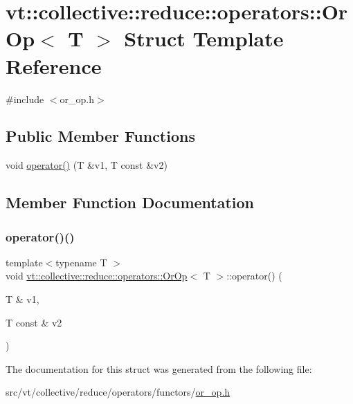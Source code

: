 \hypertarget{structvt_1_1collective_1_1reduce_1_1operators_1_1_or_op}{}\section{vt\+:\+:collective\+:\+:reduce\+:\+:operators\+:\+:Or\+Op$<$ T $>$ Struct Template Reference}
\label{structvt_1_1collective_1_1reduce_1_1operators_1_1_or_op}


{\ttfamily \#include $<$or\+\_\+op.\+h$>$}

\subsection*{Public Member Functions}
\begin{DoxyCompactItemize}
\item 
void \hyperlink{structvt_1_1collective_1_1reduce_1_1operators_1_1_or_op_aed48aa182820bb919e894d53c6576f66}{operator()} (T \&v1, T const \&v2)
\end{DoxyCompactItemize}


\subsection{Member Function Documentation}
\mbox{\label{structvt_1_1collective_1_1reduce_1_1operators_1_1_or_op_aed48aa182820bb919e894d53c6576f66}} 
\subsubsection{\texorpdfstring{operator()()}{operator()()}}
{\footnotesize\ttfamily template$<$typename T $>$ \\
void \hyperlink{structvt_1_1collective_1_1reduce_1_1operators_1_1_or_op}{vt\+::collective\+::reduce\+::operators\+::\+Or\+Op}$<$ T $>$\+::operator() (\begin{DoxyParamCaption}\item[{T \&}]{v1,  }\item[{T const \&}]{v2 }\end{DoxyParamCaption})\hspace{0.3cm}{\ttfamily [inline]}}



The documentation for this struct was generated from the following file\+:\begin{DoxyCompactItemize}
\item 
src/vt/collective/reduce/operators/functors/\hyperlink{or__op_8h}{or\+\_\+op.\+h}\end{DoxyCompactItemize}

